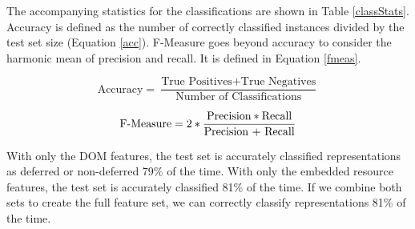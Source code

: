 \documentclass{sig-alternate}
\begin{document}
The accompanying statistics for the classifications are shown in Table \ref{classStats}. Accuracy is defined as the number of correctly classified instances divided by the test set size (Equation \ref{acc}). F-Measure goes beyond accuracy to consider the harmonic mean of precision and recall. It is defined in Equation \ref{fmeas}. 

\begin{equation}
\label{acc}
\text{Accuracy} = \frac{\text{True Positives} + \text{True Negatives}}{\text{Number of Classifications}}
\end{equation}

\begin{equation}
\label{fmeas}
\text{F-Measure} = 2 * \frac{\text{Precision} * \text{Recall}}{\text{\text{Precision} + \text{Recall}}}
\end{equation}

With only the DOM features, the test set is accurately classified representations as deferred or non-deferred 79\% of the time. With only the embedded resource features, the test set is accurately classified 81\% of the time. If we combine both sets to create the full feature set, we can correctly classify representations 81\% of the time. %
\end{document}
